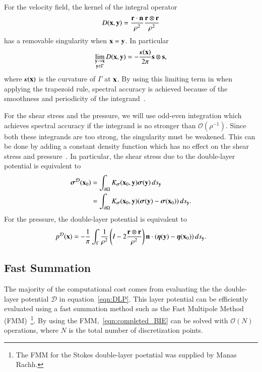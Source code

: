 \documentclass[preprint, 10pt]{elsarticle}
\begin{document}
For the velocity field, the kernel of the integral operator
\begin{align*}
  D({\mathbf{x}},{\mathbf{y}}) = \frac{{\mathbf{r}} \cdot {\mathbf{n}}}{\rho^2} 
               \frac{{\mathbf{r}} \otimes {\mathbf{r}}}{\rho^2}
\end{align*}
has a removable singularity when ${\mathbf{x}} = {\mathbf{y}}$.  In particular
\begin{align*}
  \lim_{\substack{{\mathbf{y}} \rightarrow {\mathbf{x}} \\ {\mathbf{y}} \in \Gamma}} D({\mathbf{x}},{\mathbf{y}}) = 
  -\frac{\kappa({\mathbf{x}})}{2\pi}{\mathbf{s}} \otimes {\mathbf{s}},
\end{align*}
where $\kappa({\mathbf{x}})$ is the curvature of $\Gamma$ at ${\mathbf{x}}$.  By using
this limiting term in when applying the trapezoid rule, spectral
accuracy is achieved because of the smoothness and periodicity of the
integrand~\cite{tre-wei2014}.

For the shear stress and the pressure, we will use odd-even integration
which achieves spectral accuracy if the integrand is no stronger than
$\mathcal{O}(\rho^{-1})$.  Since both these integrands are too strong,
the singularity must be weakened.  This can be done by adding a constant
density function which has no effect on the shear stress and
pressure~\cite{poz1992}.  In particular, the shear stress due to the
double-layer potential is equivalent to
\begin{align*}
  {\boldsymbol\sigma}^{{\mathcal{D}}}({\mathbf{x}}_0) &= \int_{{\partial}\Omega}K_{\boldsymbol\sigma}({\mathbf{x}}_0,{\mathbf{y}})
      {\boldsymbol\sigma}({\mathbf{y}}) \, ds_{{\mathbf{y}}} \\ 
      &= \int_{{\partial}\Omega}K_{\boldsymbol\sigma}({\mathbf{x}}_0,{\mathbf{y}})
      ({\boldsymbol\sigma}({\mathbf{y}}) - {\boldsymbol\sigma}({\mathbf{x}}_0)) \, ds_{{\mathbf{y}}}.
\end{align*}
For the pressure, the double-layer potential is equivalent to
\begin{align*}
  p^{\mathcal{D}}({\mathbf{x}}) = -\frac{1}{\pi}\int_{\Gamma} \frac{1}{\rho^2}
    \left(I - 2 \frac{{\mathbf{r}} \otimes {\mathbf{r}}}{\rho^2}\right) 
    {\mathbf{n}} \cdot ({\boldsymbol\eta}({\mathbf{y}}) - {\boldsymbol\eta}({\mathbf{x}}_0)) \,ds_{\mathbf{y}}.
\end{align*}

\subsection{Fast Summation} 
The majority of the computational cost comes from evaluating the the
double-layer potential $\mathcal{D}$ in equation~\eqref{eqn:DLP}.  This
layer potential can be efficiently evaluated using a fast summation
method such as the Fast Multipole Method
(FMM)~\cite{gre-rok1987}\footnote{The FMM for the Stokes double-layer
poetntial was supplied by Manas Rachh.}.  By using the
FMM,~\eqref{eqn:completed_BIE} can be solved with $\mathcal{O}(N)$
operations, where $N$ is the total number of discretization points.
\end{document}
